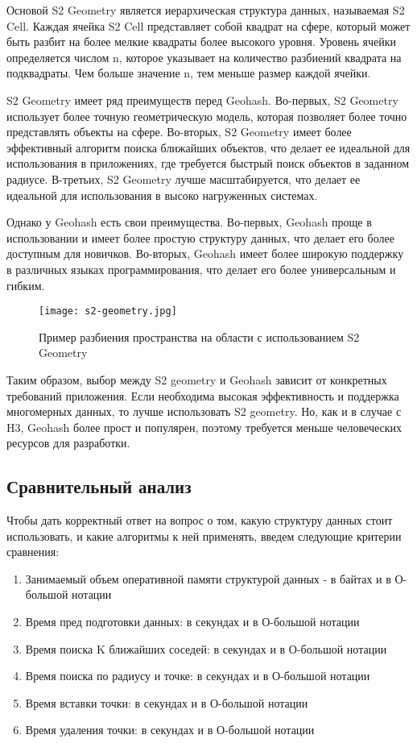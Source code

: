 Основой S2 Geometry является иерархическая структура данных, называемая S2 Cell. Каждая ячейка S2 Cell представляет собой квадрат на сфере, который может быть разбит на более мелкие квадраты более высокого уровня. Уровень ячейки определяется числом n, которое указывает на количество разбиений квадрата на подквадраты. Чем больше значение n, тем меньше размер каждой ячейки.

S2 Geometry имеет ряд преимуществ перед Geohash. Во-первых, S2 Geometry использует более точную геометрическую модель, которая позволяет более точно представлять объекты на сфере. Во-вторых, S2 Geometry имеет более эффективный алгоритм поиска ближайших объектов, что делает ее идеальной для использования в приложениях, где требуется быстрый поиск объектов в заданном радиусе. В-третьих, S2 Geometry лучше масштабируется, что делает ее идеальной для использования в высоко нагруженных системах.

Однако у Geohash есть свои преимущества. Во-первых, Geohash проще в использовании и имеет более простую структуру данных, что делает его более доступным для новичков. Во-вторых, Geohash имеет более широкую поддержку в различных языках программирования, что делает его более универсальным и гибким.


\begin{figure}[h]
    \centering
    \texttt{[image: s2-geometry.jpg]}
    \caption{Пример разбиения пространства на области с использованием S2 Geometry}
\end{figure}

Таким образом, выбор между S2 geometry и Geohash зависит от конкретных требований приложения. Если необходима высокая эффективность и поддержка многомерных данных, то лучше использовать S2 geometry. Но, как и в случае с H3, Geohash более прост и популярен, поэтому требуется меньше человеческих ресурсов для разработки.

\subsection{Сравнительный анализ}
Чтобы дать корректный ответ на вопрос о том, какую структуру данных стоит использовать, и какие алгоритмы к ней применять, введем следующие критерии сравнения:
\begin{enumerate}
    \item Занимаемый объем оперативной памяти структурой данных - в байтах и в О-большой нотации
    \item Время пред подготовки данных: в секундах и в О-большой нотации
    \item Время поиска K ближайших соседей: в секундах и в О-большой нотации
    \item Время поиска по радиусу и точке: в секундах и в О-большой нотации
    \item Время вставки точки: в секундах и в О-большой нотации
    \item Время удаления точки: в секундах и в О-большой нотации
\end{enumerate}

